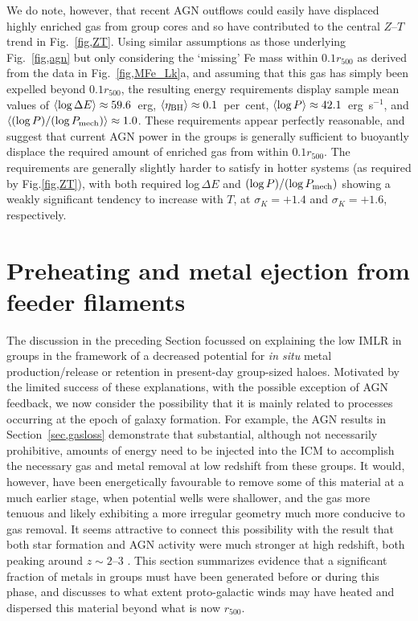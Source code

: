\documentclass[useAMS,usenatbib]{mn2e}
\begin{document}
We do note, however, that recent AGN outflows could easily have
displaced highly enriched gas from group cores and so have contributed
to the central $Z$--$T$ trend in Fig.~\ref{fig,ZT}.  Using similar
assumptions as those underlying Fig.~\ref{fig,agn} but only
considering the `missing' Fe mass within $0.1r_{500}$ as derived from
the data in Fig.~\ref{fig,MFe_Lk}a, and assuming that this gas has
simply been expelled beyond $0.1r_{500}$, the resulting energy
requirements display sample mean values of $\langle \mbox{log\,}\Delta
E\rangle \approx 59.6$~erg, $\langle \eta_{\rm BH}\rangle \approx
0.1$~per~cent, $\langle \mbox{log\,}P\rangle \approx
42.1$~erg~s$^{-1}$, and $\langle (\mbox{log\,}P)/(\mbox{log\,}P_{\rm
mech}) \rangle \approx 1.0$. These requirements appear perfectly
reasonable, and suggest that current AGN power in the groups is
generally sufficient to buoyantly displace the required amount of
enriched gas from within $0.1r_{500}$. The requirements are generally
slightly harder to satisfy in hotter systems (as required by
Fig.\ref{fig,ZT}), with both required log\,$\Delta E$ and
$(\mbox{log\,}P)/(\mbox{log\,}P_{\rm mech})$ showing a weakly
significant tendency to increase with $T$, at $\sigma_K=+1.4$ and
$\sigma_K=+1.6$, respectively.





\section{Preheating and metal ejection from feeder filaments}
\label{sec,filaments}

The discussion in the preceding Section focussed on explaining the low
IMLR in groups in the framework of a decreased potential for {\em in
situ} metal production/release or retention in present-day group-sized
haloes. Motivated by the limited success of these explanations, with
the possible exception of AGN feedback, we now consider the
possibility that it is mainly related to processes occurring at the
epoch of galaxy formation. For example, the AGN results in
Section~\ref{sec,gasloss} demonstrate that substantial, although not
necessarily prohibitive, amounts of energy need to be injected into
the ICM to accomplish the necessary gas and metal removal at low
redshift from these groups. It would, however, have been energetically
favourable to remove some of this material at a much earlier stage,
when potential wells were shallower, and the gas more tenuous and
likely exhibiting a more irregular geometry much more conducive to gas
removal.  It seems attractive to connect this possibility with the
result that both star formation and AGN activity were much stronger at
high redshift, both peaking around $z \sim 2$--3
\citep*{bouw07,hopk07}. This section summarizes evidence that a
significant fraction of metals in groups must have been generated
before or during this phase, and discusses to what extent
proto-galactic winds may have heated and dispersed this material
beyond what is now $r_{500}$.
\end{document}
